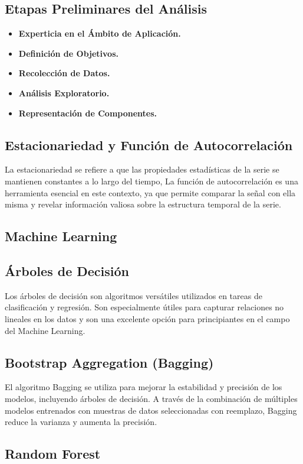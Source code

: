 \documentclass[final, 20pt, a2paper, portrait]{extarticle}
\begin{document}
\subsection*{Etapas Preliminares del Análisis}
\begin{itemize}
\item \textbf{Experticia en el Ámbito de Aplicación.} 
\item \textbf{Definición de Objetivos.}
\item \textbf{Recolección de Datos.}
\item \textbf{Análisis Exploratorio.} 
\item \textbf{Representación de Componentes.}
\end{itemize}

\subsection*{Estacionariedad y Función de Autocorrelación}
\noindent
La estacionariedad se refiere a que las propiedades estadísticas de la serie se mantienen constantes a lo largo del tiempo, La función de autocorrelación es una herramienta esencial en este contexto, ya que permite comparar la señal con ella misma y revelar información valiosa sobre la estructura temporal de la serie.

\subsection*{Machine Learning}

\subsection*{Árboles de Decisión}
Los árboles de decisión son algoritmos versátiles utilizados en tareas de clasificación y regresión. Son especialmente útiles para capturar relaciones no lineales en los datos y son una excelente opción para principiantes en el campo del Machine Learning.
\subsection*{Bootstrap Aggregation (Bagging)}
El algoritmo Bagging se utiliza para mejorar la estabilidad y precisión de los modelos, incluyendo árboles de decisión. A través de la combinación de múltiples modelos entrenados con muestras de datos seleccionadas con reemplazo, Bagging reduce la varianza y aumenta la precisión.

\subsection*{Random Forest}
\end{document}
